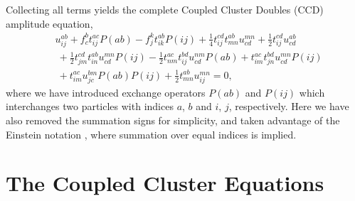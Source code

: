 Collecting all terms yields the complete Coupled Cluster Doubles (CCD) amplitude equation,
\begin{equation}
    \begin{aligned} 
        &u^{ab}_{ij} + f^b_c t^{ac}_{ij} P(ab) - f^k_j t^{ab}_{ik} P(ij)
        + \frac{1}{4}t^{cd}_{ij}t^{ab}_{mn} u^{mn}_{cd} + \frac{1}{2}t^{cd}_{ij}u^{ab}_{cd} \\
        &\ + \frac{1}{2}t^{cd}_{jm}t^{ab}_{in}u^{mn}_{cd}P(ij)
        - \frac{1}{2}t^{ac}_{nm}t^{bd}_{ij}u^{nm}_{cd}P(ab) 
        + t^{ac}_{im}t^{bd}_{jn}u^{mn}_{cd}P(ij) \\
        &\ + t^{ac}_{im}u^{bm}_{jc}P(ab)P(ij)
        + \frac{1}{2}t^{ab}_{mn}u^{mn}_{ij} = 0,
    \end{aligned}
\end{equation}
where we have introduced exchange operators $P(ab)$ and $P(ij)$ which interchanges two 
particles with indices $a$, $b$ and $i$, $j$, respectively. Here we have also removed 
the summation signs for simplicity, and taken advantage of the Einstein
notation \cite{einstein1916foundation},
where summation over equal indices is implied.

\section{The Coupled Cluster Equations}

